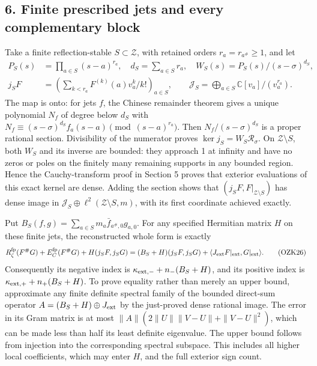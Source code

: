 \documentclass[
  10pt,
  a4paper,
]{article}
\begin{document}
\subsection{6. Finite prescribed jets and every complementary
block}\label{finite-prescribed-jets-and-every-complementary-block}

Take a finite reflection-stable \(S\subset\mathcal Z\), with retained
orders \(r_a=r_{a^\#}\ge1\), and let \[
\begin{aligned}
P_S(s)&=\prod_{a\in S}(s-a)^{r_a},\quad d_S=\sum_{a\in S}r_a,
\quad W_S(s)=P_S(s)/(s-\sigma)^{d_S},\\
j_SF&=(\sum_{k<r_a}F^{(k)}(a)v_a^k/k!)_{a\in S},\qquad
\mathcal J_S=\bigoplus_{a\in S}\mathbb C[v_a]/(v_a^{r_a}).
\end{aligned}\tag{OZK25}
\] The map is onto: for jets \(f\), the Chinese remainder theorem gives
a unique polynomial \(N_f\) of degree below \(d_S\) with
\(N_f\equiv(s-\sigma)^{d_S}f_a(s-a)\pmod{(s-a)^{r_a}}\). Then
\(N_f/(s-\sigma)^{d_S}\) is a proper rational section. Divisibility of
the numerator proves \(\ker j_S=W_S\mathcal R_\sigma\). On
\(\mathcal Z\setminus S\), both \(W_S\) and its inverse are bounded:
they approach 1 at infinity and have no zeros or poles on the finitely
many remaining supports in any bounded region. Hence the
Cauchy-transform proof in Section 5 proves that exterior evaluations of
this exact kernel are dense. Adding the section shows that
\((j_SF,F|_{\mathcal Z\setminus S})\) has dense image in
\(\mathcal J_S\oplus\ell^2(\mathcal Z\setminus S,m)\), with its first
coordinate achieved exactly.

Put \(B_S(f,g)=\sum_{a\in S}m_a\bar f_{a^\#,0}g_{a,0}\). For any
specified Hermitian matrix \(H\) on these finite jets, the reconstructed
whole form is exactly \[
R_\zeta^{\rm fp}(F^\#G)+E_C^{\rm fp}(F^\#G)+H(j_SF,j_SG)
=(B_S+H)(j_SF,j_SG)
 +\langle J_{\rm ext}F|_{\rm ext},G|_{\rm ext}\rangle.
\tag{OZK26}
\] Consequently its negative index is
\(\kappa_{{\rm ext},-}+n_-(B_S+H)\), and its positive index is
\(\kappa_{{\rm ext},+}+n_+(B_S+H)\). To prove equality rather than
merely an upper bound, approximate any finite definite spectral family
of the bounded direct-sum operator \(A=(B_S+H)\oplus J_{\rm ext}\) by
the just-proved dense rational image. The error in its Gram matrix is at
most \(\|A\|(2\|U\|\|V-U\|+\|V-U\|^2)\), which can be made less than
half its least definite eigenvalue. The upper bound follows from
injection into the corresponding spectral subspace. This includes all
higher local coefficients, which may enter \(H\), and the full exterior
sign count.
\end{document}
